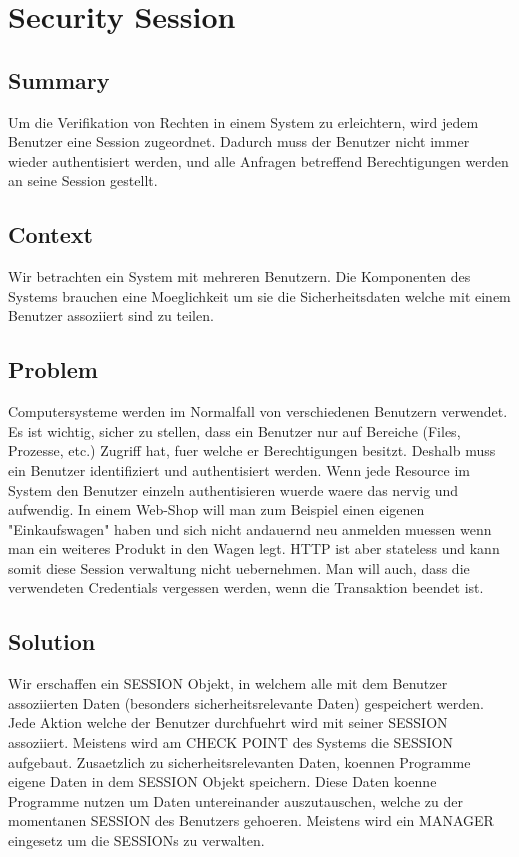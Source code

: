 \chapter{Security Session}

\section{Summary}
Um die Verifikation von Rechten in einem System zu erleichtern, wird jedem Benutzer eine Session zugeordnet. Dadurch muss der Benutzer nicht immer wieder authentisiert werden, und alle Anfragen betreffend Berechtigungen werden an seine Session gestellt.

\section{Context}
Wir betrachten ein System mit mehreren Benutzern. Die Komponenten des Systems brauchen eine Moeglichkeit um sie die Sicherheitsdaten welche mit einem Benutzer assoziiert sind zu teilen.

\section{Problem}
Computersysteme werden im Normalfall von verschiedenen Benutzern verwendet. Es ist wichtig, sicher zu stellen, dass ein Benutzer nur auf Bereiche (Files, Prozesse, etc.) Zugriff hat, fuer welche er Berechtigungen besitzt. Deshalb muss ein Benutzer identifiziert und authentisiert werden. Wenn jede Resource im System den Benutzer einzeln authentisieren wuerde waere das nervig und aufwendig. In einem Web-Shop will man zum Beispiel einen eigenen "Einkaufswagen" haben und sich nicht andauernd neu anmelden muessen wenn man ein weiteres Produkt in den Wagen legt. HTTP ist aber stateless und kann somit diese Session verwaltung nicht uebernehmen. Man will auch, dass die verwendeten Credentials vergessen werden, wenn die Transaktion beendet ist.

\section{Solution}
Wir erschaffen ein SESSION Objekt, in welchem alle mit dem Benutzer assoziierten Daten (besonders sicherheitsrelevante Daten) gespeichert werden. Jede Aktion welche der Benutzer durchfuehrt wird mit seiner SESSION assoziiert. Meistens wird am CHECK POINT des Systems die SESSION aufgebaut. Zusaetzlich zu sicherheitsrelevanten Daten, koennen Programme eigene Daten in dem SESSION Objekt speichern. Diese Daten koenne Programme nutzen um Daten untereinander auszutauschen, welche zu der momentanen SESSION des Benutzers gehoeren. Meistens wird ein MANAGER eingesetz um die SESSIONs zu verwalten.

